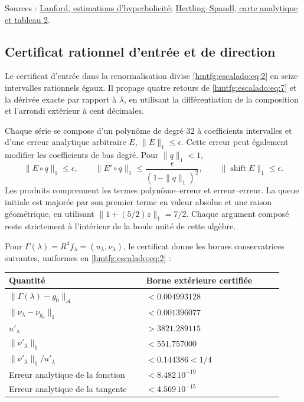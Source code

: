 Sources : \href{https://repo-archives.ihes.fr/A_GARDER/20180409/Test/I_Prepublications/LANFORD/1968-2013/P_81_17/P_81_17_web.pdf}{Lanford, estimations d’hyperbolicité}; \href{https://arxiv.org/pdf/1410.3277}{Hertling–Spandl, carte analytique et tableau 2}.


\subsection{Certificat rationnel d’entrée et de direction}
\label{hmtfg:escalado:4}

Le certificat d’entrée dans la renormalisation divise \eqref{hmtfg:escalado:eq:2} en seize intervalles rationnels égaux. Il propage quatre retours de \eqref{hmtfg:escalado:eq:7} et la dérivée exacte par rapport à \(\lambda\), en utilisant la différentiation de la composition et l’arrondi extérieur à cent décimales.

Chaque série se compose d’un polynôme de degré 32 à coefficients intervalles et d’une erreur analytique arbitraire \(E\), \(\|E\|_1\le\epsilon\). Cette erreur peut également modifier les coefficients de bas degré. Pour \(\|q\|_1<1\),
\begin{equation}
\|E\circ q\|_1\le\epsilon,\qquad
\|E'\circ q\|_1\le\frac{\epsilon}{(1-\|q\|_1)^2},\qquad
\|\operatorname{shift}E\|_1\le\epsilon.
\label{hmtfg:escalado:eq:10}
\end{equation}
Les produits comprennent les termes polynôme–erreur et erreur–erreur. La queue initiale est majorée par son premier terme en valeur absolue et une raison géométrique, en utilisant \(\|1+(5/2)z\|_1=7/2\). Chaque argument composé reste strictement à l’intérieur de la boule unité de cette algèbre.

Pour \(\Gamma(\lambda)=R^4f_\lambda=(u_\lambda,\nu_\lambda)\), le certificat donne les bornes conservatrices suivantes, uniformes en \eqref{hmtfg:escalado:eq:2} :

\begingroup\small
\begin{longtable}{p{0.465\linewidth}p{0.465\linewidth}}
\hline
Quantité & Borne extérieure certifiée \\
\hline
\(\|\Gamma(\lambda)-g_0\|_{\mathcal A}\) & \(<0.004993128\) \\
\(\|\nu_\lambda-\nu_{g_0}\|_1\) & \(<0.001396077\) \\
\(u'_\lambda\) & \(>3821.289115\) \\
\(\|\nu'_\lambda\|_1\) & \(<551.757000\) \\
\(\|\nu'_\lambda\|_1/u'_\lambda\) & \(<0.144386<1/4\) \\
Erreur analytique de la fonction & \(<8.482\,10^{-19}\) \\
Erreur analytique de la tangente & \(<4.569\,10^{-15}\) \\
\hline\end{longtable}
\endgroup

